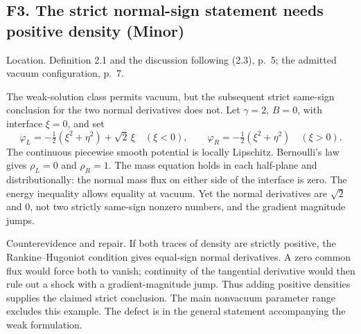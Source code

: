 \documentclass[10pt]{article}
\begin{document}
\subsection*{F3. The strict normal-sign statement needs positive density (Minor)}
Location. Definition 2.1 and the discussion following (2.3), p. 5; the admitted vacuum configuration, p. 7.\par
The weak-solution class permits vacuum, but the subsequent strict same-sign conclusion for the two normal derivatives does not. Let \(\gamma=2\), \(B=0\), with interface \(\xi=0\), and set \[\varphi_L=-\tfrac12(\xi^2+\eta^2)+\sqrt2\,\xi
 \quad(\xi<0),\qquad
 \varphi_R=-\tfrac12(\xi^2+\eta^2)
 \quad(\xi>0).\] The continuous piecewise smooth potential is locally Lipschitz. Bernoulli’s law gives \(\rho_L=0\) and \(\rho_R=1\). The mass equation holds in each half-plane and distributionally: the normal mass flux on either side of the interface is zero. The energy inequality allows equality at vacuum. Yet the normal derivatives are \(\sqrt2\) and \(0\), not two strictly same-sign nonzero numbers, and the gradient magnitude jumps.\par
Counterevidence and repair. If both traces of density are strictly positive, the Rankine–Hugoniot condition gives equal-sign normal derivatives. A zero common flux would force both to vanish; continuity of the tangential derivative would then rule out a shock with a gradient-magnitude jump. Thus adding positive densities supplies the claimed strict conclusion. The main nonvacuum parameter range excludes this example. The defect is in the general statement accompanying the weak formulation.\par
\end{document}

